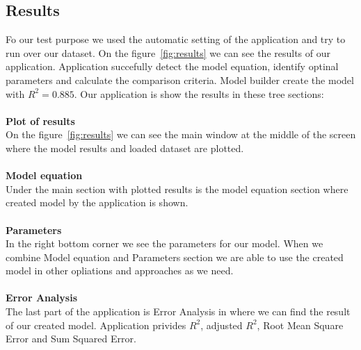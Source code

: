         \subsection{Results}\label{subsec:result}
        Fo our test purpose we used the automatic setting of the application and try to run
        over our dataset. On the figure~\ref{fig:results} we can see the results of our application.
        Application succefully detect the model equation, identify optinal parameters and 
        calculate the comparison criteria. Model builder create the model with $R^2 = 0.885$.
        Our application is show the results in these tree sections:\\
        \\
        \textbf{Plot of results}\\
        On the figure~\ref{fig:results} we can see the main window at the middle of the screen
        where the model results and loaded dataset are plotted.\\
        \\
        \textbf{Model equation}\\
        Under the main section with plotted results is the model equation section where
        created model by the application is shown.\\
        \\
        \textbf{Parameters}\\
        In the right bottom corner we see the parameters for our model. When we combine 
        Model equation and Parameters section we are able to use the created model in other
        opliations and approaches as we need.\\
        \\
        \textbf{Error Analysis}\\
        The last part of the application is Error Analysis in where we can find the 
        result of our created model. Application privides $R^2$, adjusted $R^2$,
        Root Mean Square Error and Sum Squared Error.